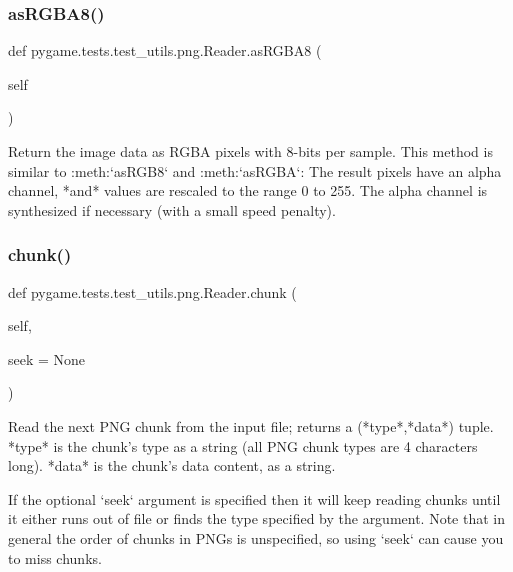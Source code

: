 \subsubsection{\texorpdfstring{as\+R\+G\+B\+A8()}{asRGBA8()}}
{\footnotesize\ttfamily def pygame.\+tests.\+test\+\_\+utils.\+png.\+Reader.\+as\+R\+G\+B\+A8 (\begin{DoxyParamCaption}\item[{}]{self }\end{DoxyParamCaption})}

\begin{DoxyVerb}Return the image data as RGBA pixels with 8-bits per
sample.  This method is similar to :meth:`asRGB8` and
:meth:`asRGBA`:  The result pixels have an alpha channel, *and*
values are rescaled to the range 0 to 255.  The alpha channel is
synthesized if necessary (with a small speed penalty).
\end{DoxyVerb}
 \mbox{\label{classpygame_1_1tests_1_1test__utils_1_1png_1_1_reader_a58578fa84d6cfec63de66cd3eac7db3c}} 
\subsubsection{\texorpdfstring{chunk()}{chunk()}}
{\footnotesize\ttfamily def pygame.\+tests.\+test\+\_\+utils.\+png.\+Reader.\+chunk (\begin{DoxyParamCaption}\item[{}]{self,  }\item[{}]{seek = {\ttfamily None} }\end{DoxyParamCaption})}

\begin{DoxyVerb}Read the next PNG chunk from the input file; returns a
(*type*,*data*) tuple.  *type* is the chunk's type as a string
(all PNG chunk types are 4 characters long).  *data* is the
chunk's data content, as a string.

If the optional `seek` argument is
specified then it will keep reading chunks until it either runs
out of file or finds the type specified by the argument.  Note
that in general the order of chunks in PNGs is unspecified, so
using `seek` can cause you to miss chunks.
\end{DoxyVerb}
 \mbox{\label{classpygame_1_1tests_1_1test__utils_1_1png_1_1_reader_a258982ed268ed154b7522191c94cfe7e}} 
